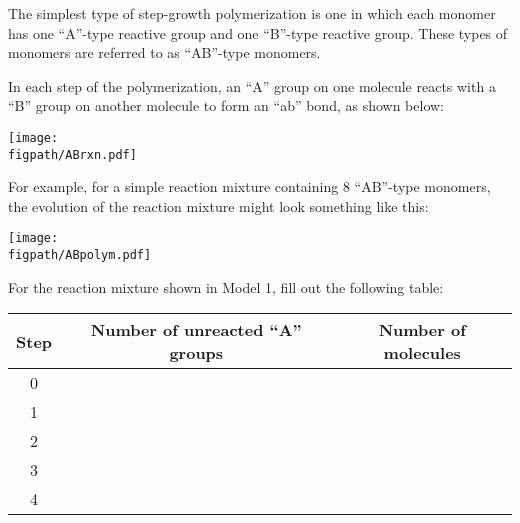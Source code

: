 %
%
%
%

\renewcommand{\figpath}{content/polymchem/stepgrowth/Mn-and-stoich/figs}

\begin{activity}


\begin{model}

The simplest type of step-growth polymerization is one in which each monomer has one ``A''-type reactive group and one ``B''-type reactive group.
These types of monomers are referred to as ``AB''-type monomers.

In each step of the polymerization, an ``A'' group on one molecule reacts with a ``B'' group on another molecule to form an ``ab'' bond, as shown below:

\vspace{0.1in}
\centerline{\texttt{[image: \\figpath/ABrxn.pdf]}}

For example, for a simple reaction mixture containing 8 ``AB''-type monomers, the evolution of the reaction mixture might look something like this:

\vspace{0.1in}
\centerline{\texttt{[image: \\figpath/ABpolym.pdf]}}

\end{model}

\begin{ctqs}

	\question \label{ctq:ABtable} For the reaction mixture shown in Model 1, fill out the following table:
		
			\begin{table}[h]
				\centering
				\renewcommand{\arraystretch}{3}
				\begin{tabular}{|c|c|c|}
					\hline
					\textbf{Step} &  \textbf{Number of unreacted ``A'' groups} & \textbf{Number of molecules} \\\hline
					0 && \\\hline
					1 && \\\hline
					2 && \\\hline
					3 && \\\hline
					4 && \\\hline
				\end{tabular}
			\end{table}
		

\end{ctqs}
\end{activity}
